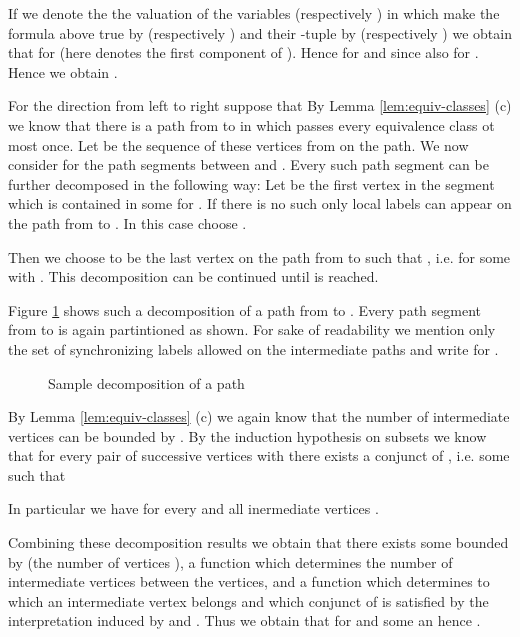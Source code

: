 \documentclass{LMCS}
\begin{document}
If we denote the the valuation of the variables  (respectively ) in  which make the formula above true by  
(respectively ) and their -tuple by  (respectively ) we obtain that 
 for  (here  denotes the
first component of ). Hence
 for  and
since 
also  for .
Hence we obtain .

For the direction from left to right suppose that 
By Lemma \ref{lem:equiv-classes} (c) we know that there is a path from  to  in  which
passes every  equivalence class ot most once. Let  be the
sequence of these vertices from  on the path. We now consider for  the path segments
between  and . Every such path segment can be further decomposed in  the following 
way: Let  be the first vertex in the segment which is contained in some  for . If there is no such  only local labels can appear on the path from  to 
. In this case choose . 

Then we choose  to be the last vertex
on the path from  to  such that ,
i.e.  for some  with .
This decomposition can be continued until  is reached. 

Figure \ref{fig:path-decomp} shows such a decomposition of a path from  to .
Every path segment from  to  is again partintioned as shown. For
sake of readability we mention only the set of synchronizing labels allowed on the intermediate 
paths and write  for .

\begin{figure}[htbp]
  \centering
  \caption{Sample decomposition of a path}
  \label{fig:path-decomp}
\end{figure}



By Lemma \ref{lem:equiv-classes} (c)
we again know that the number of intermediate vertices  can be bounded by 
. By the induction hypothesis on subsets  
we know that for every pair of successive vertices  with 
there exists a conjunct of , i.e. some  such that
 
In particular we have  for every 
and all inermediate vertices . 

Combining these decomposition results we obtain that there exists some  bounded by  (the 
number of vertices ), a function  
which determines the number of intermediate vertices  between the  vertices, and a function 
 which determines
to which  an intermediate vertex  belongs and which conjunct of  is satisfied
by the interpretation induced by  and .  Thus we obtain that 
 for  and some  an hence
.
\end{document}
